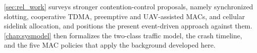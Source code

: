 \autoref{sec:rel_work} surveys stronger contention-control proposals, namely synchronized slotting, cooperative TDMA, preemptive and UAV-assisted MACs, and cellular sidelink allocation, and positions the present event-driven approach against them.
\autoref{chap:sysmodel} then formalizes the two-class traffic model, the crash timeline, and the five MAC policies that apply the background developed here.
